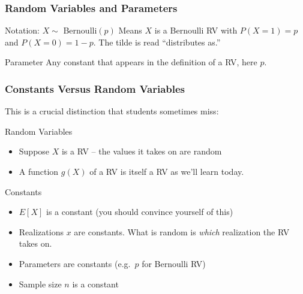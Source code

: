 \begin{frame}
\frametitle{Random Variables and Parameters}



\begin{block}{Notation: $X \sim$ Bernoulli$(p)$}
Means $X$ is a Bernoulli RV with $P(X = 1) = p$ and $P(X= 0) = 1-p$. The tilde is read ``distributes as.''

\end{block}


\begin{block}{Parameter}
Any constant that appears in the definition of a RV, here $p$. 
\end{block}


\end{frame}

\begin{frame}
\frametitle{Constants Versus Random Variables}

 \alert{This is a crucial distinction that students sometimes miss:}
 \vspace{1em}
 

 		\begin{block}{Random Variables}
 			\begin{itemize}
 			\item Suppose $X$ is a RV -- the values it takes on are random
 			\item A function $g(X)$ of a RV is itself a RV as we'll learn today.
 			\end{itemize}
 		\end{block}
 
 		\begin{block}{Constants}
 			\begin{itemize}
 				\item $E[X]$ is a constant (you should convince yourself of this)
 				\item Realizations $x$ are constants. What is random is \emph{which} realization the RV takes on.
 				\item Parameters are constants (e.g.\ $p$ for Bernoulli RV)
 				\item Sample size $n$ is a constant
 			\end{itemize}
 		\end{block} 

\end{frame}
